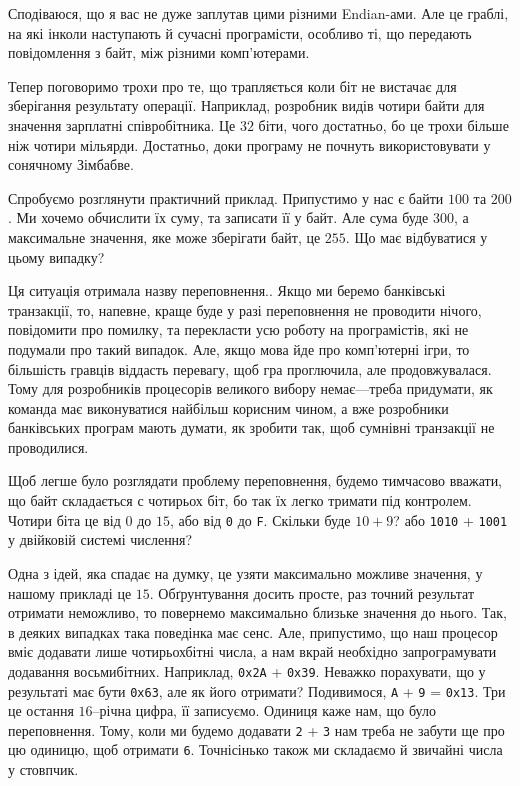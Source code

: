 \documentclass{book}
\newcommand{\bitstr}[1]{{\tt #1}}
\newcommand{\hexstr}[1]{{\tt 0x#1}}
\begin{document}
Сподіваюся, що я вас не дуже заплутав цими різними Endian-ами.
Але це граблі, на які інколи наступають й сучасні програмісти, особливо ті, що передають повідомлення з байт, між різними комп'ютерами.

\medskip

Тепер поговоримо трохи про те, що трапляється коли біт не вистачає для зберігання результату операції.
Наприклад, розробник видів чотири байти для значення зарплатні співробітника.
Це $32$ біти, чого достатньо, бо це трохи більше ніж чотири мільярди.
Достатньо, доки програму не почнуть використовувати у сонячному Зімбабве.

Спробуємо розглянути практичний приклад.
Припустимо у нас є байти $100$ та $200$.
Ми хочемо обчислити їх суму, та записати її у байт.
Але сума буде $300$, а максимальне значення, яке може зберігати байт, це $255$.
Що має відбуватися у цьому випадку?

Ця ситуація отримала назву переповнення..
Якщо ми беремо банківські транзакції, то, напевне, краще буде у разі переповнення не проводити нічого, повідомити про помилку, та перекласти усю роботу на програмістів, які не подумали про такий випадок.
Але, якщо мова йде про комп'ютерні ігри, то більшість гравців віддасть перевагу, щоб гра проглючила, але продовжувалася.
Тому для розробників процесорів великого вибору немає---треба придумати, як команда має виконуватися найбільш корисним чином, а вже розробники банківських програм мають думати, як зробити так, щоб сумнівні транзакції не проводилися.

Щоб легше було розглядати проблему переповнення, будемо тимчасово вважати, що байт складається с чотирьох біт, бо так їх легко тримати під контролем.
Чотири біта це від $0$ до $15$, або від \bitstr{0} до \bitstr{F}.
Скільки буде $10 + 9$? або \bitstr{1010} + \bitstr{1001} у двійковій системі числення?

Одна з ідей, яка спадає на думку, це узяти максимально можливе значення, у нашому прикладі це $15$.
Обґрунтування досить просте, раз точний результат отримати неможливо, то повернемо максимально близьке значення до нього.
Так, в деяких випадках така поведінка має сенс.
Але, припустимо, що наш процесор вміє додавати лише чотирьохбітні числа, а нам вкрай необхідно запрограмувати додавання восьмибітних.
Наприклад, \hexstr{2A} + \hexstr{39}.
Неважко порахувати, що у результаті має бути \hexstr{63}, але як його отримати?
Подивимося, \bitstr{A} + \bitstr{9} = \hexstr{13}.
Три це остання $16$--річна цифра, її записуємо.
Одиниця каже нам, що було переповнення.
Тому, коли ми будемо додавати \bitstr{2} + \bitstr{3} нам треба не забути ще про цю одиницю, щоб отримати \bitstr{6}.
Точнісінько також ми складаємо й звичайні числа у стовпчик.
\end{document}
